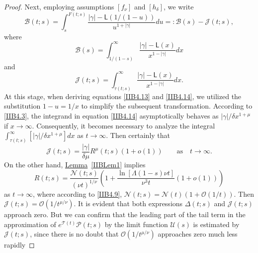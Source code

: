 \documentclass[10pt,reqno]{amsart}
\theoremstyle{definition}
\numberwithin{equation}{section}
\begin{document}
\begin{proof}
    Next, employing assumptions $[{f_{\nu}}]$ and $[{h_{\delta}}]$, we write
\begin{equation}                \label{IIB4.12}
    \mathcal{B}(t;s)=\int_{s}^{F(t;s)}{\frac{|\gamma|-\textsf{L}\left({1}\big/{(1-u)}\right)}{{{u}^{1+|\gamma|}}}du}
    =:\mathcal{B}(s)-\mathcal{J}(t;s),
\end{equation}
    where
\begin{equation}                \label{IIB4.13}
    \mathcal{B}(s)=\int_{{1}\big/{(1-s)}}^{\infty}{\frac{|\gamma|-\textsf{L}(x)}{{x^{1-|\gamma|}}}dx}
\end{equation}
    and
\begin{equation}                \label{IIB4.14}
    \mathcal{J}(t;s)=\int_{\tau(t;s)}^{\infty}{\frac{|\gamma|-\textsf{L}(x)}{x^{1-|\gamma|}}dx}.
\end{equation}
    At this stage, when deriving equations {\eqref{IIB4.13}} and {\eqref{IIB4.14}}, we utilized the substitution $1-u={1}/{x}$
    to simplify the subsequent transformation. According to {\eqref{IIB4.3}}, the integrand in equation {\eqref{IIB4.14}}
    asymptotically behaves as ${|\gamma|}/{\delta{x^{1+\mu}}}$ if $x\to\infty$. Consequently, it becomes necessary
    to analyze the integral $\int_{\tau(t;s)}^{\infty}{\left[|\gamma|/{\delta{x^{1+\mu}}}\right]dx}$ as $t\to\infty$.
    Then certainly that
\begin{equation}                \label{IIB4.15}
    \mathcal{J}(t;s)=\frac{|\gamma|}{\delta\mu}{{R}^{\mu}}(t;s)\left(1+o(1)\right)
    \qquad {\text{as}} \quad {t\to\infty}.
\end{equation}
    On the other hand, {\hyperref[IIBLem1]{Lemma}~\ref{IIBLem1}} implies
\begin{equation}                \label{IIB4.16}
    R(t;s)=\frac{\mathcal{N}(t;s)}{{(\nu{t})}^{{1}/{\nu}}}
    \left(1+\frac{\ln\left[\Lambda(1-s)\nu{t}\right]}{{{\nu}^{3}}t}\left(1+o(1)\right)\right)
\end{equation}
    as $t\to\infty$, where according to {\eqref{IIB4.9}},
    $\mathcal{N}(t;s)=\mathcal{N}(t)\left(1+\mathcal{O}\left({1}/{t}\right)\right)$. Then
    $\mathcal{J}(t;s)=\mathcal{O}\left( {1}/{{t^{\mu/\nu}}}\right)$. It is evident that both expressions $\Delta (t;s)$
    and $\mathcal{J}(t;s)$ approach zero. But we can confirm that the leading part of the tail term in the approximation
    of ${e^{\mathcal{T}(t)}}\mathcal{P}(t;s)$ by the limit function $\mathcal{U}(s)$ is estimated by $\mathcal{J}(t;s)$,
    since there is no doubt that $\mathcal{O}\left({1}/{t^{\mu/\nu}}\right)$ approaches zero much less rapidly

\end{proof}
\end{document}
